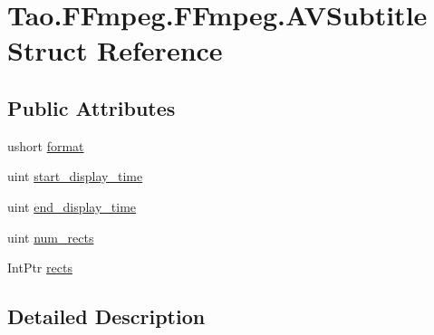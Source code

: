 \hypertarget{struct_tao_1_1_f_fmpeg_1_1_f_fmpeg_1_1_a_v_subtitle}{
\section{Tao.FFmpeg.FFmpeg.AVSubtitle Struct Reference}
\label{struct_tao_1_1_f_fmpeg_1_1_f_fmpeg_1_1_a_v_subtitle}
}
\subsection*{Public Attributes}
\begin{DoxyCompactItemize}
\item 
ushort \hyperlink{struct_tao_1_1_f_fmpeg_1_1_f_fmpeg_1_1_a_v_subtitle_acb7425663bffcfd668bd7c6226381648}{format}
\item 
uint \hyperlink{struct_tao_1_1_f_fmpeg_1_1_f_fmpeg_1_1_a_v_subtitle_a8d810e6236f0b489f31b1a6fc5c856d2}{start\_\-display\_\-time}
\item 
uint \hyperlink{struct_tao_1_1_f_fmpeg_1_1_f_fmpeg_1_1_a_v_subtitle_a1537cda71104c7de887f7e0456a728b0}{end\_\-display\_\-time}
\item 
uint \hyperlink{struct_tao_1_1_f_fmpeg_1_1_f_fmpeg_1_1_a_v_subtitle_ae5c414ffe18cfe6966ec1fabba2d084f}{num\_\-rects}
\item 
IntPtr \hyperlink{struct_tao_1_1_f_fmpeg_1_1_f_fmpeg_1_1_a_v_subtitle_a721024059823d4985263f2e7aaa29d68}{rects}
\end{DoxyCompactItemize}


\subsection{Detailed Description}


